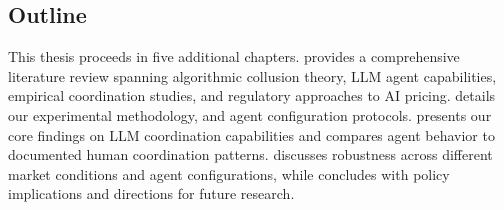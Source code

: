 \subsection{Outline}

This thesis proceeds in five additional chapters.  provides a comprehensive literature review spanning algorithmic collusion theory, LLM agent capabilities, empirical coordination studies, and regulatory approaches to AI pricing.  details our experimental methodology, and agent configuration protocols.  presents our core findings on LLM coordination capabilities and compares agent behavior to documented human coordination patterns.  discusses robustness across different market conditions and agent configurations, while  concludes with policy implications and directions for future research.

